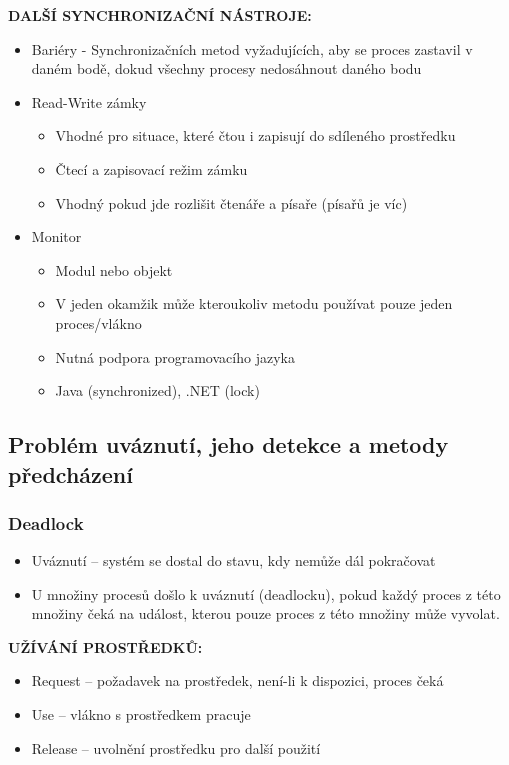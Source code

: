\documentclass[10pt,a4paper]{article}
\begin{document}
\textbf{DALŠÍ SYNCHRONIZAČNÍ NÁSTROJE:}
\begin{itemize}
	\item Bariéry - Synchronizačních metod vyžadujících, aby se proces zastavil v daném bodě, dokud všechny procesy nedosáhnout daného bodu
	\item Read-Write zámky
	\begin{itemize}
		\item Vhodné pro situace, které čtou i zapisují do sdíleného prostředku
		\item Čtecí a zapisovací režim zámku
		\item Vhodný pokud jde rozlišit čtenáře a písaře (písařů je víc)
	\end{itemize}
	\item Monitor
	\begin{itemize}
		\item Modul nebo objekt
		\item V jeden okamžik může kteroukoliv metodu používat pouze jeden proces/vlákno
		\item Nutná podpora programovacího jazyka
		\item Java (synchronized), .NET (lock)
	\end{itemize}
\end{itemize}

\subsection{Problém uváznutí, jeho detekce a metody předcházení}

\subsubsection{Deadlock}
\begin{itemize}
	\item Uváznutí – systém se dostal do stavu, kdy nemůže dál pokračovat
	\item U množiny procesů došlo k uváznutí (deadlocku), pokud každý proces z této množiny čeká na událost, kterou pouze proces z této množiny může vyvolat.
\end{itemize}

\textbf{UŽÍVÁNÍ PROSTŘEDKŮ:}
\begin{itemize}
	\item Request – požadavek na prostředek, není-li k dispozici, proces čeká
	\item Use – vlákno s prostředkem pracuje
	\item Release – uvolnění prostředku pro další použití
\end{itemize}
\end{document}
